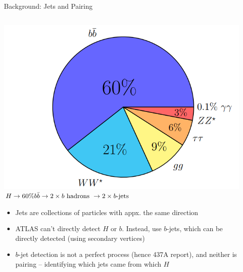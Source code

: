 \documentclass[10pt, aspectratio=169]{beamer}
\begin{document}
{
\begin{frame}{Background: Jets and Pairing}
  \begin{columns}[onlytextwidth]
    \begin{column}{0.76\textwidth}
      \centering
      \includegraphics[width=0.35\linewidth]{images/branching_ratios.png}\\
      $H \to 60\%\space b\bar{b} \to 2 \times b \text{ hadrons } \to 2 \times b\text{-jets}$
      \begin{itemize}
        \item \alert{Jets} are collections of particles with appx. the same direction
        \item ATLAS can't directly detect $H$ or $b$. Instead, use \alert{$b$-jets}, which can be directly detected (using secondary vertices)
        \item $b$-jet detection is not a perfect process (hence 437A report), and neither is \alert{pairing} -- identifying which jets came from which $H$
      \end{itemize}
    \end{column}
    \begin{column}{0.25\textwidth}

\end{column}
\end{columns}
\end{frame}}
\end{document}
